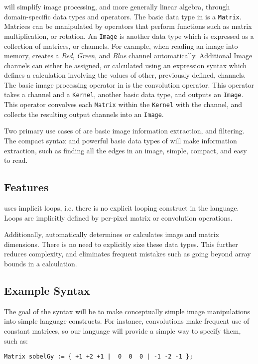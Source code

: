 \sys{} will simplify image processing, and more generally linear algebra, through
domain-specific data types and operators. The basic data type in \sys{} is a 
\texttt{Matrix}. Matrices can be manipulated by operators that perform functions
such as matrix multiplication, or rotation. An \texttt{Image} is another \sys{}
data type which is expressed as a collection of matrices, or channels. For example,
when reading an image into memory, \sys{} creates a \emph{Red}, \emph{Green}, and
\emph{Blue} channel automatically. Additional Image channels can either be assigned,
or calculated using an expression syntax which defines a calculation involving the
values of other, previously defined, channels. The basic image processing operator
in \sys{} is the convolution operator. This operator takes a channel and a
\texttt{Kernel}, another basic data type, and outputs an \texttt{Image}. This
operator convolves each \texttt{Matrix} within the \texttt{Kernel} with the channel,
and collects the resulting output channels into an \texttt{Image}.

Two primary use cases of \sys{} are basic image information extraction, and
filtering. The compact syntax and powerful basic data types of \sys{} will make
information extraction, such as finding all the edges in an image, simple, compact,
and easy to read.

\subsection*{Features}
\sys{} uses implicit loops, i.e. there is no explicit looping construct in the
language. Loops are implicitly defined by per-pixel matrix or convolution
operations.

Additionally, \sys{} automatically determines or calculates image and matrix
dimensions. There is no need to explicitly size these data types. This further
reduces complexity, and eliminates frequent mistakes such as going beyond array
bounds in a calculation.



\subsection*{Example Syntax}

The goal of the \sys{} syntax will be to make conceptually simple image
manipulations into simple language constructs. For instance, convolutions make
frequent use of constant matrices, so our language will provide a simple way
to specify them, such as:
\begin{lstlisting}[language=PLTF11]
    Matrix sobelGy := { +1 +2 +1 |  0  0  0 | -1 -2 -1 };
\end{lstlisting}

